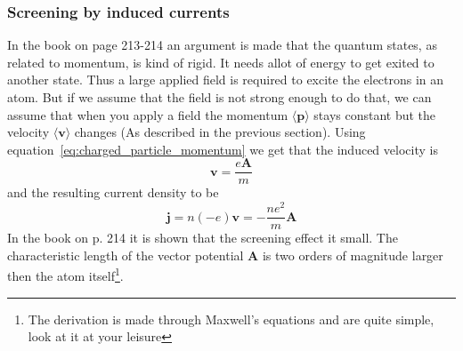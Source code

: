 \documentclass[11pt]{article}
\begin{document}
\subsubsection{Screening by induced currents}
In the book on page 213-214 an argument is made that the quantum states, as related to momentum, is kind of rigid. It needs allot of energy to get exited to another state. Thus a large applied field is required to excite the electrons in an atom. But if we assume that the field is not strong enough to do that, we can assume that when you apply a field the momentum $\langle \pmb{p} \rangle$ stays constant but the velocity $\langle \pmb{v} \rangle$ changes (As described in the previous section). Using equation~\ref{eq:charged_particle_momentum} we get that the induced velocity is
\begin{equation}
	\pmb{v} = \frac{e\pmb{A}}{m}
\end{equation}
and the resulting current density to be
\begin{equation}
	\pmb{j} = n(-e) \pmb{v} = - \frac{ne^2}{m} \pmb{A}
	\label{eq:atomic_current_density}
\end{equation}
In the book on p. 214 it is shown that the screening effect it small. The characteristic length of the vector potential $\pmb{A}$ is two orders of magnitude larger then the atom itself\footnote{The derivation is made through Maxwell's equations and are quite simple, look at it at your leisure}. 

\newpage
\end{document}
